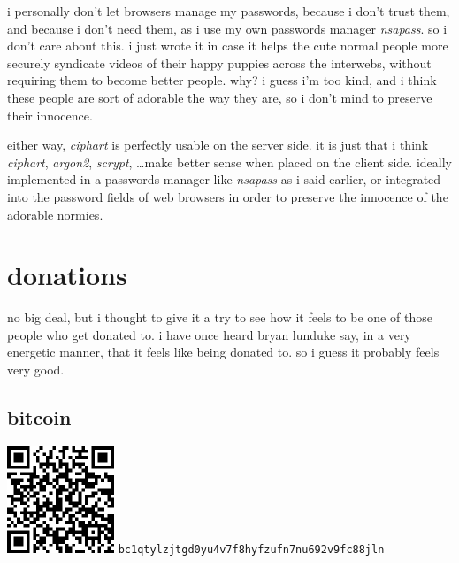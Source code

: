 \documentclass[twocolumn]{article}
\begin{document}
i personally don't let browsers manage my passwords, because i don't trust
them, and because i don't need them, as i use my own passwords manager
\emph{nsapass}.  so i don't care about this.  i just wrote it in case it
helps the cute normal people more securely syndicate videos of their happy
puppies across the interwebs, without requiring them to become better
people.  why?  i guess i'm too kind, and i think these people are sort of
adorable the way they are, so i don't mind to preserve their innocence.

either  way, \emph{ciphart} is perfectly usable on the server side.  it is
just that i think \emph{ciphart}, \emph{argon2}, \emph{scrypt}, \ldots make
better sense when placed on the client side.  ideally implemented in a
passwords manager like \emph{nsapass} as i said earlier, or integrated into
the password fields of web browsers in order to preserve the innocence of
the adorable normies.

\vfill
\break
\appendix
\section{donations}
no big deal, but i thought to give it a try to see how it feels to be one
of those people who get donated to.  i have once heard bryan lunduke say,
in a very energetic manner, that it feels like being donated to.  so i
guess it probably feels very good.
\subsection{bitcoin}
\begin{center}
    \includegraphics[width=121px]{./pics/btc_wallet_address_trimmed.png}
    \texttt{bc1qtylzjtgd0yu4v7f8hyfzufn7nu692v9fc88jln}
\end{center}
\end{document}
